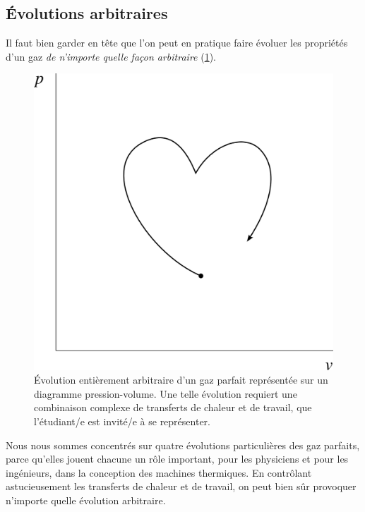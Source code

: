 		
	\subsection{Évolutions arbitraires}
	
		Il faut bien garder en tête que l’on peut en pratique faire évoluer les propriétés d’un gaz \emph{de n’importe quelle façon arbitraire} (\cref{fig_gp_pv_coeur}).
		
		\begin{figure}
			\begin{center}
				\includegraphics[width=\pvdiagramwidth]{images/pv_coeur.png}
			\end{center}
			\caption{Évolution entièrement arbitraire d’un gaz parfait représentée sur un diagramme pression-volume. Une telle évolution requiert une combinaison complexe de transferts de chaleur et de travail, que l’étudiant/e est invité/e à se représenter.}
			\label{fig_gp_pv_coeur}
		\end{figure}
		
		Nous nous sommes concentrés sur quatre évolutions particulières des gaz parfaits, parce qu’elles jouent chacune un rôle important, pour les physiciens et pour les ingénieurs, dans la conception des machines thermiques. En contrôlant astucieusement les transferts de chaleur et de travail, on peut bien sûr provoquer n’importe quelle évolution arbitraire.
